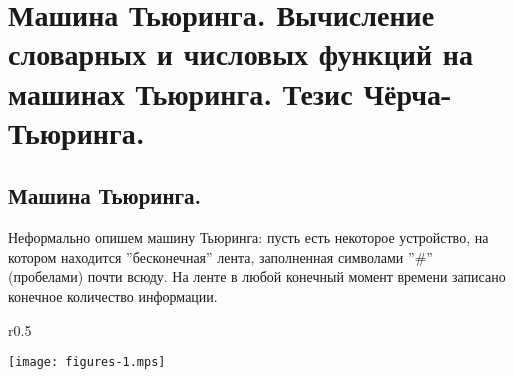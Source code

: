 \section{Машина Тьюринга. Вычисление словарных и числовых функций на машинах Тьюринга. Тезис Чёрча- Тьюринга.}
\subsection*{Машина Тьюринга.}
\par Неформально опишем машину Тьюринга: пусть есть некоторое устройство, на
котором находится ''бесконечная'' лента, заполненная символами ''$\#$''
(пробелами) почти всюду.
На ленте в любой конечный момент времени записано конечное количество информации.

\begin{wrapfigure}{r}{0.5\textwidth}
	\begin{center}
		\texttt{[image: figures-1.mps]}
	\end{center}
\end{wrapfigure}

